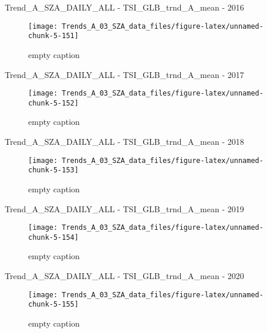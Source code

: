 \documentclass[
  10pt,
  a4paper,oneside]{article}
\begin{document}
Trend\_A\_SZA\_DAILY\_ALL - TSI\_GLB\_trnd\_A\_mean - 2016

\begin{figure}[!ht]

{\centering \texttt{[image: Trends\_A\_03\_SZA\_data\_files/figure-latex/unnamed-chunk-5-151]} 

}

\caption{ empty caption }\label{fig:unnamed-chunk-5-151}
\end{figure}

Trend\_A\_SZA\_DAILY\_ALL - TSI\_GLB\_trnd\_A\_mean - 2017

\begin{figure}[!ht]

{\centering \texttt{[image: Trends\_A\_03\_SZA\_data\_files/figure-latex/unnamed-chunk-5-152]} 

}

\caption{ empty caption }\label{fig:unnamed-chunk-5-152}
\end{figure}

Trend\_A\_SZA\_DAILY\_ALL - TSI\_GLB\_trnd\_A\_mean - 2018

\begin{figure}[!ht]

{\centering \texttt{[image: Trends\_A\_03\_SZA\_data\_files/figure-latex/unnamed-chunk-5-153]} 

}

\caption{ empty caption }\label{fig:unnamed-chunk-5-153}
\end{figure}

Trend\_A\_SZA\_DAILY\_ALL - TSI\_GLB\_trnd\_A\_mean - 2019

\begin{figure}[!ht]

{\centering \texttt{[image: Trends\_A\_03\_SZA\_data\_files/figure-latex/unnamed-chunk-5-154]} 

}

\caption{ empty caption }\label{fig:unnamed-chunk-5-154}
\end{figure}

Trend\_A\_SZA\_DAILY\_ALL - TSI\_GLB\_trnd\_A\_mean - 2020

\begin{figure}[!ht]

{\centering \texttt{[image: Trends\_A\_03\_SZA\_data\_files/figure-latex/unnamed-chunk-5-155]} 

}

\caption{ empty caption }\label{fig:unnamed-chunk-5-155}
\end{figure}
\end{document}
